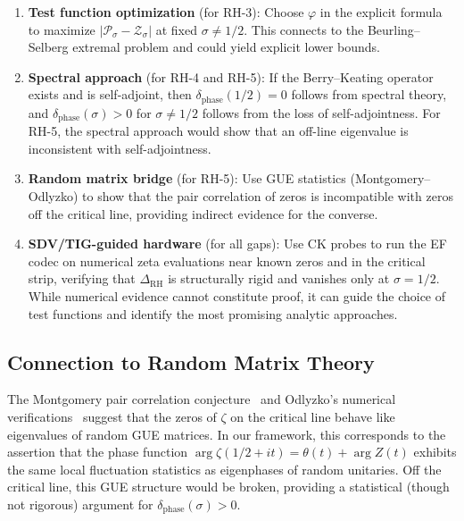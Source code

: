 \documentclass[11pt]{article}
\theoremstyle{remark}
\begin{document}
\begin{enumerate}
  \item \textbf{Test function optimization} (for RH-3):
    Choose $\varphi$ in the explicit formula to maximize
    $|\mathcal{P}_\sigma-\mathcal{Z}_\sigma|$ at fixed $\sigma\neq 1/2$.
    This connects to the Beurling--Selberg extremal problem and could yield
    explicit lower bounds.

  \item \textbf{Spectral approach} (for RH-4 and RH-5):
    If the Berry--Keating operator exists and is self-adjoint, then
    $\delta_{\mathrm{phase}}(1/2)=0$ follows from spectral theory, and
    $\delta_{\mathrm{phase}}(\sigma)>0$ for $\sigma\neq 1/2$ follows from the loss
    of self-adjointness.
    For RH-5, the spectral approach would show that an off-line eigenvalue is
    inconsistent with self-adjointness.

  \item \textbf{Random matrix bridge} (for RH-5):
    Use GUE statistics (Montgomery--Odlyzko) to show that the pair correlation of
    zeros is incompatible with zeros off the critical line, providing indirect
    evidence for the converse.

  \item \textbf{SDV/TIG-guided hardware} (for all gaps):
    Use CK probes to run the EF codec on numerical zeta evaluations near known
    zeros and in the critical strip, verifying that $\Delta_{\mathrm{RH}}$ is
    structurally rigid and vanishes only at $\sigma=1/2$.
    While numerical evidence cannot constitute proof, it can guide the choice of
    test functions and identify the most promising analytic approaches.
\end{enumerate}

\subsection{Connection to Random Matrix Theory}

The Montgomery pair correlation conjecture~\cite{Mont} and Odlyzko's numerical
verifications~\cite{Odl} suggest that the zeros of $\zeta$ on the critical line
behave like eigenvalues of random GUE matrices.
In our framework, this corresponds to the assertion that the phase function
$\arg\zeta(1/2+it)=\theta(t)+\arg Z(t)$ exhibits the same local fluctuation
statistics as eigenphases of random unitaries.
Off the critical line, this GUE structure would be broken, providing a statistical
(though not rigorous) argument for $\delta_{\mathrm{phase}}(\sigma)>0$.
\end{document}
